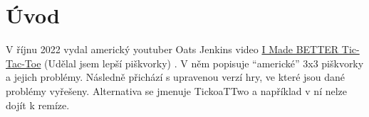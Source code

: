 \makeatletter
\renewcommand{\@chapapp}{}%
\newenvironment{chapquote}[2][2em]
  {\setlength{\@tempdima}{#1}%
   \def\chapquote@author{#2}%
   \parshape 1 \@tempdima \dimexpr\textwidth-2\@tempdima\relax%
   \itshape}
  {\par\normalfont\hfill--\ \chapquote@author\hspace*{\@tempdima}\par\bigskip}
\makeatother

\chapter*{Úvod}

V říjnu 2022 vydal americký youtuber Oats Jenkins video
\href{https://www.youtube.com/watch?v=ePxrVU4M9uA}{I Made BETTER Tic-Tac-Toe}
(Udělal jsem lepší piškvorky) \cite{jenkins22}. V něm popisuje \enquote{americké} 3x3 piškvorky a jejich
problémy. Následně přichází s upravenou verzí hry, ve které jsou dané problémy vyřešeny.
Alternativa se jmenuje TickoaTTwo a například v ní nelze dojít k remíze.
